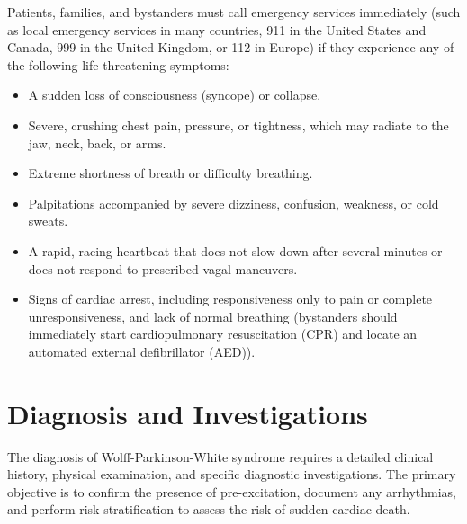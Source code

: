 Patients, families, and bystanders must call emergency services immediately (such as local emergency services in many countries, 911 in the United States and Canada, 999 in the United Kingdom, or 112 in Europe) if they experience any of the following life-threatening symptoms:
\begin{itemize}
  \item A sudden loss of consciousness (syncope) or collapse.
  \item Severe, crushing chest pain, pressure, or tightness, which may radiate to the jaw, neck, back, or arms.
  \item Extreme shortness of breath or difficulty breathing.
  \item Palpitations accompanied by severe dizziness, confusion, weakness, or cold sweats.
  \item A rapid, racing heartbeat that does not slow down after several minutes or does not respond to prescribed vagal maneuvers.
  \item Signs of cardiac arrest, including responsiveness only to pain or complete unresponsiveness, and lack of normal breathing (bystanders should immediately start cardiopulmonary resuscitation (CPR) and locate an automated external defibrillator (AED)).
\end{itemize}

\section*{Diagnosis and Investigations}
The diagnosis of Wolff-Parkinson-White syndrome requires a detailed clinical history, physical examination, and specific diagnostic investigations. The primary objective is to confirm the presence of pre-excitation, document any arrhythmias, and perform risk stratification to assess the risk of sudden cardiac death.

